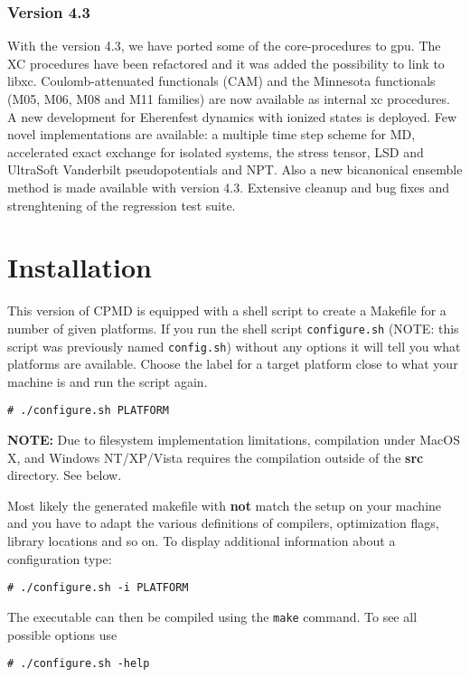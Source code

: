 \documentclass[twoside,10pt,titlepage,a4paper]{article}
\newcommand{\shellcommand}[1]{%
  \vspace*{3mm}
  \noindent
  \texttt{\# #1}
  \vspace*{3mm}
}
\begin{document}
\subsubsection{Version 4.3} 
%
With the version 4.3, we have ported some of the core-procedures to gpu. The XC procedures
have been refactored and it was added the possibility to link to libxc.
Coulomb-attenuated functionals (CAM) and the Minnesota functionals (M05, M06, M08 and
M11 families) are now available as internal xc procedures.
A new development for Eherenfest dynamics with ionized states is deployed.
Few novel implementations are available: a multiple time step scheme for MD,
accelerated exact exchange for isolated systems, 
the stress tensor, LSD and UltraSoft Vanderbilt pseudopotentials and NPT.
Also a new bicanonical ensemble method is made available with version 4.3.
Extensive cleanup and bug fixes and strenghtening of the regression test suite.


\clearpage
\section{Installation}\label{installation}
%
This version of CPMD is equipped with a shell script to create 
a Makefile for a number of given platforms. If you run the shell 
script \texttt{configure.sh} (NOTE: this script was previously
named \texttt{config.sh}) without any options it will tell you 
what platforms are available. Choose the label for a target 
platform close to what your machine is and run the script again.

\shellcommand{./configure.sh PLATFORM }

\textbf{NOTE:} Due to filesystem implementation limitations,
compilation under MacOS X, and Windows NT/XP/Vista requires the
compilation outside of the \textbf{src} directory. See below.

Most likely the generated makefile with \textbf{not} match the
setup on your machine and you have to adapt the various definitions 
of compilers, optimization flags, library locations and so on.
To display additional information about a configuration type:

\shellcommand{./configure.sh -i PLATFORM}

The executable can then be compiled using the \texttt{make} command. 
To see all possible options use

\shellcommand{./configure.sh -help}
\end{document}

